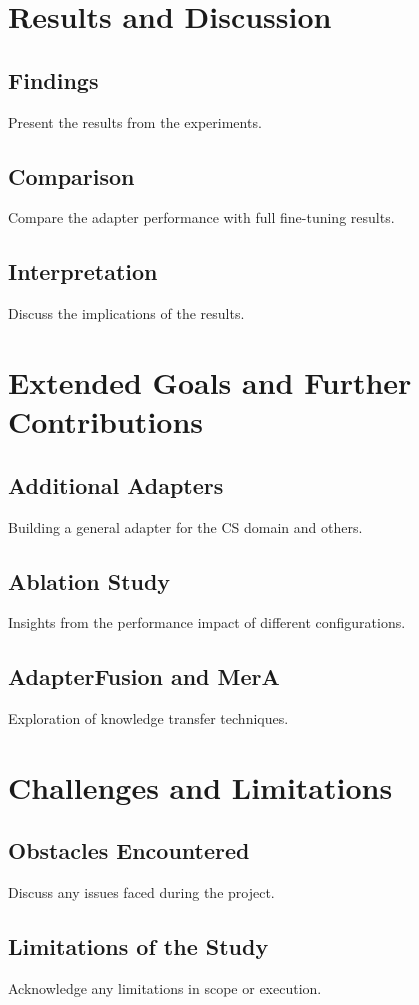\documentclass[12pt]{article}
\begin{document}
\section{Results and Discussion}
\subsection{Findings}
Present the results from the experiments.
\subsection{Comparison}
Compare the adapter performance with full fine-tuning results.
\subsection{Interpretation}
Discuss the implications of the results.

\section{Extended Goals and Further Contributions}
\subsection{Additional Adapters}
Building a general adapter for the CS domain and others.
\subsection{Ablation Study}
Insights from the performance impact of different configurations.
\subsection{AdapterFusion and MerA}
Exploration of knowledge transfer techniques.

\section{Challenges and Limitations}
\subsection{Obstacles Encountered}
Discuss any issues faced during the project.
\subsection{Limitations of the Study}
Acknowledge any limitations in scope or execution.
\end{document}
